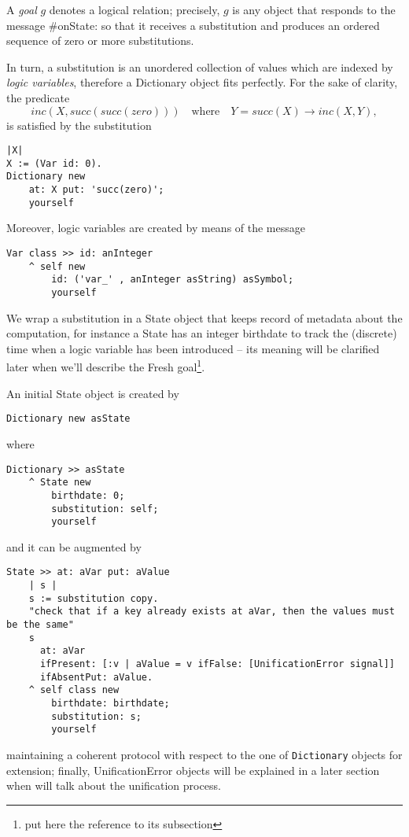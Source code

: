 \documentclass[a4paper,11pt]{article}
\newcommand{\ct}[1]{{\textsf{#1}}\xspace}
\begin{document}
A \textit{goal} $g$ denotes a logical relation; precisely, $g$ is any object
that responds to the message \ct{\#onState:} so that it receives a substitution
and produces an ordered sequence of zero or more substitutions.

In turn, a substitution is an unordered collection of
values which are indexed by \textit{logic variables}, therefore a
\ct{Dictionary} object fits perfectly. For the sake of clarity, the predicate
\begin{displaymath}
inc(X, succ(succ(zero))) \quad\text{where}\quad Y = succ(X) \rightarrow inc(X, Y),
\end{displaymath}
is satisfied by the substitution
\begin{verbatim}
|X|
X := (Var id: 0).
Dictionary new
    at: X put: 'succ(zero)';
    yourself
\end{verbatim}

Moreover, logic variables are created by means of the message
\begin{verbatim}
Var class >> id: anInteger
    ^ self new
        id: ('var_' , anInteger asString) asSymbol;
        yourself
\end{verbatim}

We wrap a substitution in a \ct{State} object that keeps record of metadata
about the computation, for instance a \ct{State} has an integer \ct{birthdate}
to track the (discrete) time when a logic variable has been introduced -- its
meaning will be clarified later when we'll describe the \ct{Fresh}
goal\footnote{put here the reference to its subsection}.

An initial \ct{State} object is created by
\begin{verbatim}
Dictionary new asState
\end{verbatim}
where
\begin{verbatim}
Dictionary >> asState
    ^ State new
        birthdate: 0;
        substitution: self;
        yourself
\end{verbatim}
and it can be augmented by
\begin{verbatim}
State >> at: aVar put: aValue
    | s |
    s := substitution copy.
    "check that if a key already exists at aVar, then the values must be the same"
    s
      at: aVar
      ifPresent: [:v | aValue = v ifFalse: [UnificationError signal]]
      ifAbsentPut: aValue.
    ^ self class new
        birthdate: birthdate;
        substitution: s;
        yourself
\end{verbatim}
maintaining a coherent protocol with respect to the one of \Verb|Dictionary|
objects for extension; finally, \ct{UnificationError} objects will be
explained in a later section when will talk about the unification process.
\end{document}
